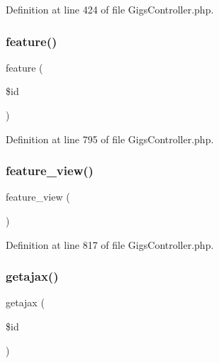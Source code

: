 Definition at line 424 of file Gigs\+Controller.\+php.

\mbox{\label{class_responsive_1_1_http_1_1_controllers_1_1_gigs_controller_ad4318a6b3d8bb110cb44af152f9df7f1}} 
\subsubsection{\texorpdfstring{feature()}{feature()}}
{\footnotesize\ttfamily feature (\begin{DoxyParamCaption}\item[{}]{\$id }\end{DoxyParamCaption})}



Definition at line 795 of file Gigs\+Controller.\+php.

\mbox{\label{class_responsive_1_1_http_1_1_controllers_1_1_gigs_controller_aa85b054fcf6fcf22e84df0e8e708369a}} 
\subsubsection{\texorpdfstring{feature\_view()}{feature\_view()}}
{\footnotesize\ttfamily feature\+\_\+view (\begin{DoxyParamCaption}{ }\end{DoxyParamCaption})}



Definition at line 817 of file Gigs\+Controller.\+php.

\mbox{\label{class_responsive_1_1_http_1_1_controllers_1_1_gigs_controller_a4835696e5f4f4682a41359c1c5192a28}} 
\subsubsection{\texorpdfstring{getajax()}{getajax()}}
{\footnotesize\ttfamily getajax (\begin{DoxyParamCaption}\item[{}]{\$id }\end{DoxyParamCaption})}



